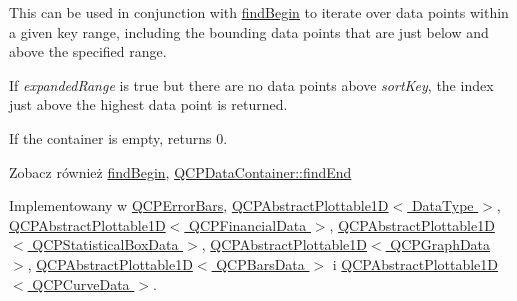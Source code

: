 This can be used in conjunction with \hyperlink{class_q_c_p_plottable_interface1_d_a5b95783271306a4de97be54eac1e7d13}{find\+Begin} to iterate over data points within a given key range, including the bounding data points that are just below and above the specified range.

If {\itshape expanded\+Range} is true but there are no data points above {\itshape sort\+Key}, the index just above the highest data point is returned.

If the container is empty, returns 0.

\begin{DoxySeeAlso}{Zobacz również}
\hyperlink{class_q_c_p_plottable_interface1_d_a5b95783271306a4de97be54eac1e7d13}{find\+Begin}, \hyperlink{class_q_c_p_data_container_ad9b6b0343252eb3bbd591ee28aaa4e9d}{Q\+C\+P\+Data\+Container\+::find\+End} 
\end{DoxySeeAlso}


Implementowany w \hyperlink{class_q_c_p_error_bars_ad22dd8499c6d45176ad0651751a0b0b0}{Q\+C\+P\+Error\+Bars}, \hyperlink{class_q_c_p_abstract_plottable1_d_a6e3ba20c9160d7361e58070390d10b1a}{Q\+C\+P\+Abstract\+Plottable1\+D$<$ Data\+Type $>$}, \hyperlink{class_q_c_p_abstract_plottable1_d_a6e3ba20c9160d7361e58070390d10b1a}{Q\+C\+P\+Abstract\+Plottable1\+D$<$ Q\+C\+P\+Financial\+Data $>$}, \hyperlink{class_q_c_p_abstract_plottable1_d_a6e3ba20c9160d7361e58070390d10b1a}{Q\+C\+P\+Abstract\+Plottable1\+D$<$ Q\+C\+P\+Statistical\+Box\+Data $>$}, \hyperlink{class_q_c_p_abstract_plottable1_d_a6e3ba20c9160d7361e58070390d10b1a}{Q\+C\+P\+Abstract\+Plottable1\+D$<$ Q\+C\+P\+Graph\+Data $>$}, \hyperlink{class_q_c_p_abstract_plottable1_d_a6e3ba20c9160d7361e58070390d10b1a}{Q\+C\+P\+Abstract\+Plottable1\+D$<$ Q\+C\+P\+Bars\+Data $>$} i \hyperlink{class_q_c_p_abstract_plottable1_d_a6e3ba20c9160d7361e58070390d10b1a}{Q\+C\+P\+Abstract\+Plottable1\+D$<$ Q\+C\+P\+Curve\+Data $>$}.

